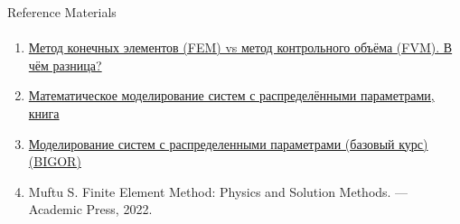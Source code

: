 \documentclass[aspectratio=169]{beamer}
\newcommand{\fbckg}[1]{\usebackgroundtemplate{\texttt{[image: \#1]}}}%
\begin{document}
\begin{frame}[t]{Reference Materials}
    \framesubtitle{}
    \begin{enumerate}
        \item \href{https://youtu.be/p1AJqBWYEVE}{Метод конечных элементов (FEM) vs метод контрольного объёма (FVM). В чём разница?}
        \item \href{http://auts.samgtu.ru/sites/auts.samgtu.ru/files/upUSRP.pdf}{Математическое моделирование систем с распределёнными параметрами, книга}
        \item \href{http://bigor.bmstu.ru/?cnt/?doc=Mkr/base.cou}{Моделирование систем с распределенными параметрами (базовый курс) (BIGOR)}
        \item Muftu S. Finite Element Method: Physics and Solution Methods. --- Academic Press, 2022.
    \end{enumerate}
\end{frame}





\fbckg{fibeamer/figs/last_page.png}
\frame[plain]{}
\end{document}
